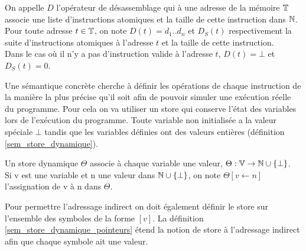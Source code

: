 \begin{defi}
On appelle $D$ l'opérateur de désassemblage qui à une adresse de la mémoire $\mathbb T$ associe une liste d'instructions atomiques et la taille de cette instruction dans $\mathbb N$. \\
Pour toute adresse $t\in\mathbb T$, on note $D(t)=d_1..d_n$ et $D_S(t)$ respectivement la suite d'instructions atomiques à l'adresse $t$ et la taille de cette instruction.\\
Dans le cas où il n'y a pas d'instruction valide à l'adresse $t$, $D(t)=\bot$ et $D_S(t)=0$.
\label{def:sem_desassembleur}
\end{defi}

Une sémantique concrète cherche à définir les opérations de chaque instruction de la manière la plus précise qu'il soit afin de pouvoir simuler une exécution réelle du programme.
Pour cela on va utiliser un store qui conserve l'état des variables lors de l'exécution du programme.
Toute variable non initialisée a la valeur spéciale $\bot$ tandis que les variables définies ont des valeurs entières (définition \ref{sem_store_dynamique}).

\begin{defi}
 Un store dynamique $\Theta$ associe à chaque variable une valeur, $\Theta:\mathbb V\rightarrow\mathbb N\cup\{\bot\}$.\\
 Si v est une variable et n une valeur dans $\mathbb N\cup\{\bot\}$, on note $\Theta[v\leftarrow n]$ l'assignation de v à n dans $\Theta$.
\label{sem_store_dynamique}
\end{defi}

Pour permettre l'adressage indirect on doit également définir le store sur l'ensemble des symboles de la forme $[v]$.
La définition \ref{sem_store_dynamique_pointeurs} étend la notion de store à l'adressage indirect afin que chaque symbole ait une valeur.


